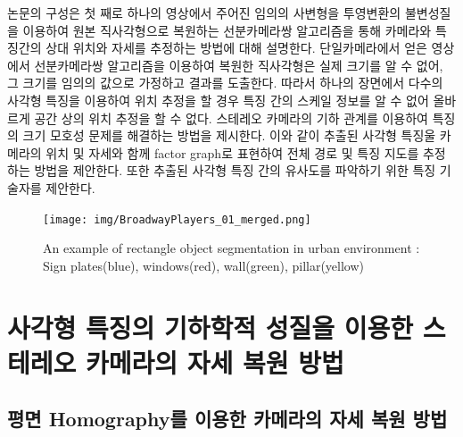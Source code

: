 \documentclass[master,korean,final]{cbnu-ecs}
\begin{document}
논문의 구성은 첫 째로 하나의 영상에서 주어진 임의의 사변형을 투영변환의 불변성질을 이용하여 원본 직사각형으로 복원하는 선분카메라쌍 알고리즘을 통해 카메라와 특징간의 상대 위치와 자세를 추정하는 방법에 대해 설명한다. 단일카메라에서 얻은 영상에서 선분카메라쌍 알고리즘을 이용하여 복원한 직사각형은 실제 크기를 알 수 없어, 그 크기를 임의의 값으로 가정하고 결과를 도출한다. 따라서 하나의 장면에서 다수의 사각형 특징을 이용하여 위치 추정을 할 경우 특징 간의 스케일 정보를 알 수 없어 올바르게 공간 상의 위치 추정을 할 수 없다. 스테레오 카메라의 기하 관계를 이용하여 특징의 크기 모호성 문제를 해결하는 방법을 제시한다. 이와 같이 추출된 사각형 특징울 카메라의 위치 및 자세와 함께 factor graph로 표현하여 전체 경로 및 특징 지도를 추정하는 방법을 제안한다. 또한 추출된 사각형 특징 간의 유사도를 파악하기 위한 특징 기술자를 제안한다. 
\newpage
\begin{figure}[!ht]
  \centering
	\texttt{[image: img/BroadwayPlayers\_01\_merged.png]}
  \caption{An example of rectangle object segmentation in urban environment : Sign plates(blue), windows(red), wall(green), pillar(yellow)}
\label{envexample}
\end{figure}

\newpage
\chapter{사각형 특징의 기하학적 성질을 이용한 스테레오 카메라의 자세 복원 방법}

\section{평면 Homography를 이용한 카메라의 자세 복원 방법}
\end{document}
